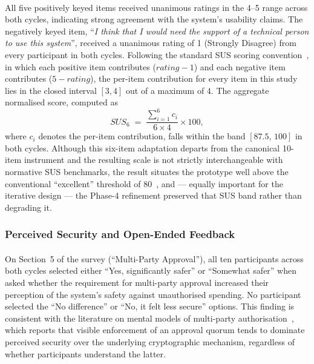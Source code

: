 \paragraph{}All five positively keyed items received unanimous ratings in the 4--5 range across both cycles, indicating strong agreement with the system's usability claims. The negatively keyed item, ``\textit{I think that I would need the support of a technical person to use this system}'', received a unanimous rating of 1 (Strongly Disagree) from every participant in both cycles. Following the standard SUS scoring convention~\cite{brooke1996sus, bangor2008sus}, in which each positive item contributes ($\textit{rating} - 1$) and each negative item contributes ($5 - \textit{rating}$), the per-item contribution for every item in this study lies in the closed interval $[3, 4]$ out of a maximum of $4$. The aggregate normalised score, computed as
\[
\textit{SUS}_{6} \;=\; \frac{\sum_{i=1}^{6} c_i}{6 \times 4} \times 100,
\]
where $c_i$ denotes the per-item contribution, falls within the band $[87.5,\, 100]$ in both cycles. Although this six-item adaptation departs from the canonical 10-item instrument and the resulting scale is not strictly interchangeable with normative SUS benchmarks, the result situates the prototype well above the conventional ``excellent'' threshold of 80~\cite{bangor2008sus}, and --- equally important for the iterative design --- the Phase-4 refinement preserved that SUS band rather than degrading it.

\subsubsection{Perceived Security and Open-Ended Feedback}
\label{sect:results_uat_open}

\paragraph{}On Section~5 of the survey (``Multi-Party Approval''), all ten participants across both cycles selected either ``Yes, significantly safer'' or ``Somewhat safer'' when asked whether the requirement for multi-party approval increased their perception of the system's safety against unauthorised spending. No participant selected the ``No difference'' or ``No, it felt less secure'' options. This finding is consistent with the literature on mental models of multi-party authorisation~\cite{komlo2021}, which reports that visible enforcement of an approval quorum tends to dominate perceived security over the underlying cryptographic mechanism, regardless of whether participants understand the latter.

